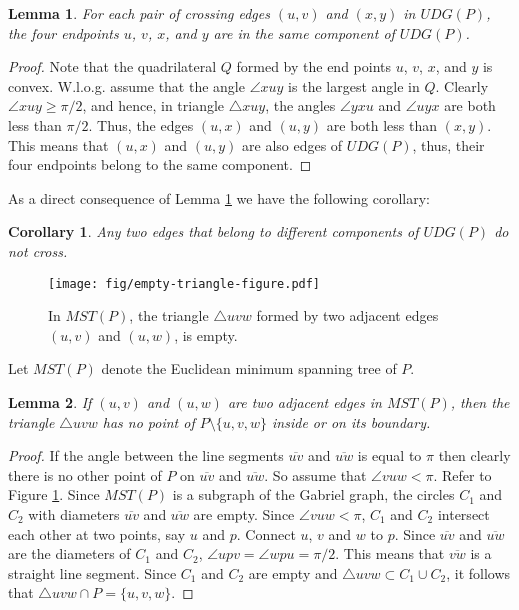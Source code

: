 \documentclass[11pt,a4paper]{article}
\newtheorem{lemma}{Lemma}
\newtheorem{corollary}{Corollary}
\begin{document}
\begin{lemma}
\label{same-component}
 For each pair of crossing edges $(u,v)$ and $(x,y)$ in $UDG(P)$, the four endpoints $u$, $v$, $x$, and $y$ are in the same component of $UDG(P)$. 
\end{lemma}
\begin{proof}
Note that the quadrilateral $Q$ formed by the end points $u$, $v$, $x$, and $y$ is convex. W.l.o.g. assume that the angle $\angle xuy$ is the largest angle in $Q$. Clearly $\angle xuy \ge \pi/2$, and hence, in triangle $\bigtriangleup xuy$, the angles $\angle yxu$ and $\angle uyx$ are both less than $\pi/2$. Thus, the edges $(u,x)$ and $(u,y)$ are both less than $(x,y)$. This means that $(u,x)$ and $(u,y)$ are also edges of $UDG(P)$, thus, their four endpoints belong to the same component.  
\end{proof}

As a direct consequence of Lemma \ref{same-component} we have the following corollary: 

\begin{corollary}
\label{non-crossing-edges}
Any two edges that belong to different components of $UDG(P)$ do not cross.
\end{corollary}

\begin{figure}[ht]
  \centering
    \texttt{[image: fig/empty-triangle-figure.pdf]}
  \caption{In $MST(P)$, the triangle $\bigtriangleup uvw$ formed by two adjacent edges $(u,v)$ and $(u,w)$, is empty.}
\label{empty-triangle-figure}
\end{figure}

Let $MST(P)$ denote the Euclidean minimum spanning tree of $P$.

\begin{lemma}
\label{empty-triangle-lemma}
If $(u,v)$ and $(u,w)$ are two adjacent edges in $MST(P)$, then the triangle $\bigtriangleup uvw$ has no point of $P\setminus\{u, v, w\}$ inside or on its boundary.
\end{lemma}
\begin{proof}
If the angle between the line segments $\overline{uv}$ and $\overline{uw}$ is equal to $\pi$ then clearly there is no other point of $P$ on $\overline{uv}$ and $\overline{uw}$. So assume that $\angle vuw < \pi$. Refer to Figure \ref{empty-triangle-figure}. Since $MST(P)$ is a subgraph of the Gabriel graph, the circles $C_1$ and $C_2$ with diameters $\overline{uv}$ and $\overline{uw}$ are empty. Since $\angle vuw < \pi$, $C_1$ and $C_2$ intersect each other at two points, say $u$ and $p$. Connect $u$, $v$ and $w$ to $p$. Since $\overline{uv}$ and $\overline{uw}$ are the diameters of $C_1$ and $C_2$, $\angle upv=\angle wpu=\pi/2$.
This means that $\overline{vw}$ is a straight line segment. Since $C_1$ and $C_2$ are empty and $\bigtriangleup uvw \subset C_1 \cup C_2$, it follows that $\bigtriangleup uvw \cap P = \{u, v, w\}$.
\end{proof}
\end{document}
